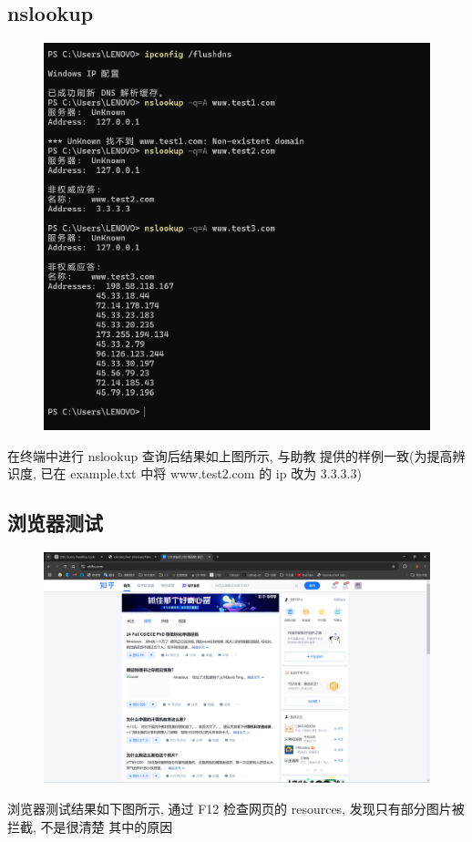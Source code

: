 \documentclass[UTF8]{ctexart}
\begin{document}
\begin{sloppypar}
    \subsection{nslookup}
        \begin{figure}[h]
            \centering
            \includegraphics[scale=0.25]{resources/terminal_output1.png}
        \end{figure}
        在终端中进行 nslookup 查询后结果如上图所示, 与助教
        提供的样例一致(为提高辨识度, 已在 example.txt
         中将 www.test2.com 的 ip 改为 3.3.3.3)
    \subsection{浏览器测试}
        \begin{figure}[h]
            \centering
            \includegraphics[scale=0.15]{resources/zhihu_output.png}
        \end{figure}
        浏览器测试结果如下图所示, 通过 F12 检查网页的
         resources, 发现只有部分图片被拦截, 不是很清楚
        其中的原因



\end{sloppypar}
\end{document}
